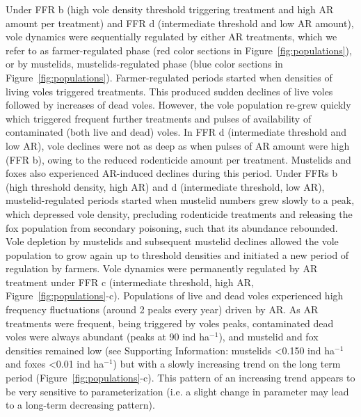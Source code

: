 \documentclass[11pt]{article}
\begin{document}
Under FFR b (high vole density threshold triggering treatment and high AR amount per treatment) and FFR d (intermediate threshold and low AR amount), vole dynamics were sequentially regulated by either AR treatments, which we refer to as farmer-regulated phase (red color sections in Figure~\ref{fig:populations}), or by mustelids, mustelids-regulated phase (blue color sections in Figure~\ref{fig:populations}). Farmer-regulated periods started when densities of living voles triggered treatments. This produced sudden declines of live voles followed by increases of dead voles. However, the vole population re-grew quickly which triggered frequent further treatments and pulses of availability of contaminated (both live and dead) voles. In FFR d (intermediate threshold and low AR), vole declines were not as deep as when pulses of AR amount were high (FFR b), owing to the reduced rodenticide amount per treatment. Mustelids and foxes also experienced AR-induced declines during this period. Under FFRs b (high threshold density, high AR) and d (intermediate threshold, low AR), mustelid-regulated periods started when mustelid numbers grew slowly to a peak, which depressed vole density, precluding rodenticide treatments and releasing the fox population from secondary poisoning, such that its abundance rebounded. Vole depletion by mustelids and subsequent mustelid declines allowed the vole population to grow again up to threshold densities and initiated a new period of regulation by farmers.
%
Vole dynamics were permanently regulated by AR treatment under FFR c (intermediate threshold, high AR, Figure~\ref{fig:populations}-c). Populations of live and dead voles experienced high frequency fluctuations (around 2 peaks every year) driven by AR. As AR treatments were frequent, being triggered by voles peaks, contaminated dead voles were always abundant (peaks at 90 ind ha$^{-1}$), and mustelid and fox densities remained low (see Supporting Information: mustelids <0.150 ind ha$^{-1}$ and foxes <0.01 ind ha$^{-1}$) but with a slowly increasing trend on the long term period (Figure~\ref{fig:populations}-c). This pattern of an increasing trend appears to be very sensitive to parameterization (i.e. a slight change in parameter may lead to a long-term decreasing pattern).
%
\end{document}
